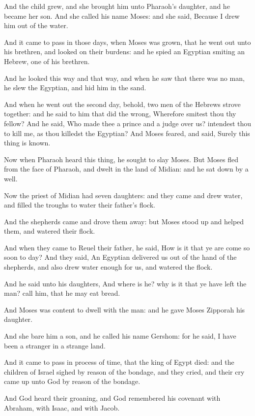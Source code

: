\verse And the child grew, and she brought him unto Pharaoh's daughter, and he became her son. And she called his name Moses: and she said, Because I drew him out of the water.

\verse And it came to pass in those days, when Moses was grown, that he went out unto his brethren, and looked on their burdens: and he spied an Egyptian smiting an Hebrew, one of his brethren.

\verse And he looked this way and that way, and when he saw that there was no man, he slew the Egyptian, and hid him in the sand.

\verse And when he went out the second day, behold, two men of the Hebrews strove together: and he said to him that did the wrong, Wherefore smitest thou thy fellow?  \verse And he said, Who made thee a prince and a judge over us? intendest thou to kill me, as thou killedst the Egyptian? And Moses feared, and said, Surely this thing is known.

\verse Now when Pharaoh heard this thing, he sought to slay Moses. But Moses fled from the face of Pharaoh, and dwelt in the land of Midian: and he sat down by a well.

\verse Now the priest of Midian had seven daughters: and they came and drew water, and filled the troughs to water their father's flock.

\verse And the shepherds came and drove them away: but Moses stood up and helped them, and watered their flock.

\verse And when they came to Reuel their father, he said, How is it that ye are come so soon to day?  \verse And they said, An Egyptian delivered us out of the hand of the shepherds, and also drew water enough for us, and watered the flock.

\verse And he said unto his daughters, And where is he? why is it that ye have left the man? call him, that he may eat bread.

\verse And Moses was content to dwell with the man: and he gave Moses Zipporah his daughter.

\verse And she bare him a son, and he called his name Gershom: for he said, I have been a stranger in a strange land.

\verse And it came to pass in process of time, that the king of Egypt died: and the children of Israel sighed by reason of the bondage, and they cried, and their cry came up unto God by reason of the bondage.

\verse And God heard their groaning, and God remembered his covenant with Abraham, with Isaac, and with Jacob.

